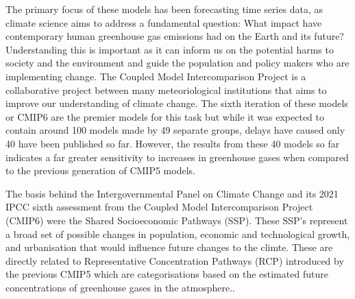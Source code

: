 \documentclass[honours,12pt]{unswthesis}
\numberwithin{equation}{section}
\begin{document}
{\noindent}The primary focus of these models has been forecasting time series data, as climate science aims to address a fundamental question: 
What impact have contemporary human greenhouse gas emissions had on the Earth and its future?
Understanding this is important as it can inform us on the potential harms to society and the environment and guide the population and policy makers who are implementing change.
The Coupled Model Intercomparison Project is a collaborative project between many meteoriological institutions that aims to improve our understanding of climate change.
The sixth iteration of these models or CMIP6 are the premier models for this task but while it was expected to contain around 100 models made by 49 separate groups, 
delays have caused only 40 have been published so far.
However, the results from these 40 models so far indicates a far greater sensitivity to increases in greenhouse gases when compared to the previous generation of CMIP5 models.\cite{Harrisson_2021}

{\noindent}The basis behind the Intergovernmental Panel on Climate Change and its 2021 IPCC sixth assessment from the Coupled Model Intercomparison Project (CMIP6) were the Shared Socioeconomic Pathways (SSP).\cite{lee2021future}
These SSP's represent a broad set of possible changes in population, economic and technological growth, and urbanisation that would influence future changes to the climte.\cite{RIAHI2017153}  
These are directly related to Representative Concentration Pathways (RCP) introduced by the previous CMIP5 which are categorisations based on the 
estimated future concentrations of greenhouse gases in the atmosphere.\cite{Harrisson_2021_SSP}.
\end{document}
